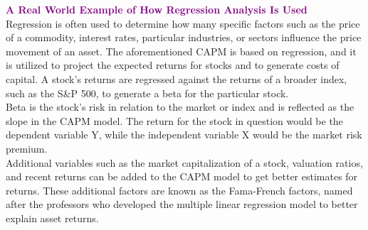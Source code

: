 \textbf{\textcolor{purple}{A Real World Example of How Regression Analysis Is Used}}\\

Regression is often used to determine how many specific factors such as the price of a commodity, interest rates, particular industries, or sectors influence the price movement of an asset. The aforementioned CAPM is based on regression, and it is utilized to project the expected returns for stocks and to generate costs of capital. A stock's returns are regressed against the returns of a broader index, such as the S&P 500, to generate a beta for the particular stock.\\

Beta is the stock's risk in relation to the market or index and is reflected as the slope in the CAPM model. The return for the stock in question would be the dependent variable Y, while the independent variable X would be the market risk premium.\\

Additional variables such as the market capitalization of a stock, valuation ratios, and recent returns can be added to the CAPM model to get better estimates for returns. These additional factors are known as the Fama-French factors, named after the professors who developed the multiple linear regression model to better explain asset returns.\\

